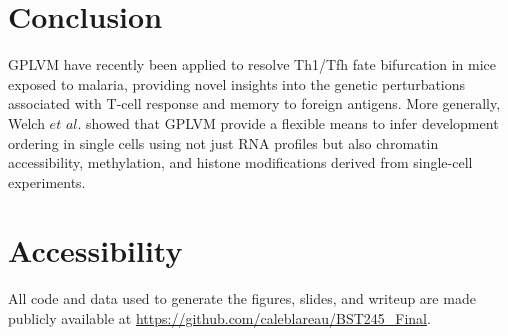 \documentclass[english, 11pt]{article}\usepackage[]{graphicx}\usepackage[]{color}
\begin{document}
\section{Conclusion}

GPLVM have recently been applied to resolve Th1/Tfh fate bifurcation in mice exposed to malaria, providing novel insights into the genetic perturbations associated with T-cell response and memory to foreign antigens. \cite{lonnberg2017single} More generally, Welch $et$ $al.$ showed that GPLVM provide a flexible means to infer development ordering in single cells using not just RNA profiles but also chromatin accessibility, methylation, and histone modifications derived from single-cell experiments. \cite{welch2017manifold}

\section*{Accessibility}

All code and data used to generate the figures, slides, and writeup are made publicly available at \url{https://github.com/caleblareau/BST245_Final}.

\newpage{}



{}
\end{document}
